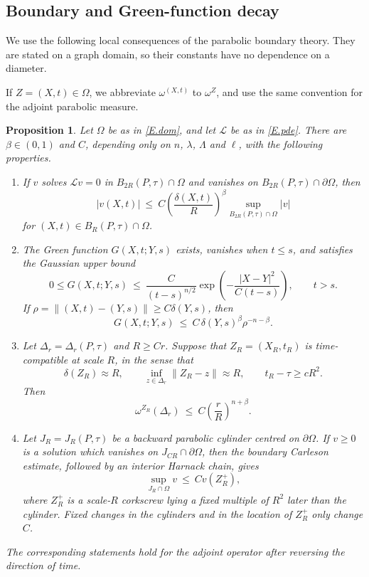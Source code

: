 \documentclass[10pt,a4paper]{amsart}
\numberwithin{equation}{section}
\newcommand{\om}{\Omega}
\newcommand{\pom}{\partial\Omega}
\newcommand{\LL}{\mathcal L}
\newtheorem{proposition}[equation]{Proposition}
\begin{document}
\subsection{Boundary and Green-function decay}\label{ss.potdecay}

We use the following local consequences of the parabolic boundary
theory. They are stated on a graph domain, so their constants have no
dependence on a diameter.

If $Z=(X,t)\in\om$, we abbreviate $\omega^{(X,t)}$ to $\omega^Z$, and use
the same convention for the adjoint parabolic measure.

\begin{proposition}\label{P.potdecay}
Let $\om$ be as in \eqref{E.dom}, and let $\LL$ be as in \eqref{E.pde}. There
are $\beta\in(0,1)$ and $C$, depending only on $n$, $\lambda$, $\Lambda$ and
$\ell$, with the following properties.
\begin{enumerate}
\item If $v$ solves $\LL v=0$ in $B_{2R}(P,\tau)\cap\om$ and vanishes on
  $B_{2R}(P,\tau)\cap\pom$, then
  \begin{equation}\label{E.bdryHolder}
   |v(X,t)|\ \le\ C\left(\frac{\delta(X,t)}R\right)^\beta
   \sup_{B_{2R}(P,\tau)\cap\om}|v|
  \end{equation}
  for $(X,t)\in B_R(P,\tau)\cap\om$.
\item The Green function $G(X,t;Y,s)$ exists, vanishes when $t\le s$, and
  satisfies the Gaussian upper bound
  \begin{equation}\label{E.GreenGaussian}
   0\le G(X,t;Y,s)\ \le\
   \frac{C}{(t-s)^{n/2}}
   \exp\left(-\frac{|X-Y|^2}{C(t-s)}\right),\qquad t>s.
  \end{equation}
  If $\rho=\|(X,t)-(Y,s)\|\ge C\delta(Y,s)$, then
  \begin{equation}\label{E.Greenbdry}
   G(X,t;Y,s)\ \le\ C\,\delta(Y,s)^\beta\rho^{-n-\beta}.
  \end{equation}
\item Let $\Delta_r=\Delta_r(P,\tau)$ and $R\ge Cr$.  Suppose that
  $Z_R=(X_R,t_R)$ is time-compatible at scale $R$, in the sense that
  \[
   \delta(Z_R)\approx R,\qquad
   \inf_{z\in\Delta_r}\|Z_R-z\|\approx R,\qquad t_R-\tau\ge cR^2.
  \]
  Then
  \begin{equation}\label{E.omegadecay}
   \omega^{Z_R}(\Delta_r)\ \le\ C\left(\frac rR\right)^{n+\beta}.
  \end{equation}
\item Let $J_R=J_R(P,\tau)$ be a backward parabolic cylinder centred on
  $\pom$. If $v\ge0$ is a solution which vanishes on $J_{CR}\cap\pom$, then
  the boundary Carleson estimate, followed by an interior
  Harnack chain, gives
  \begin{equation}\label{E.boundaryCarleson}
   \sup_{J_R\cap\om}v\ \le\ C v(Z_R^+),
  \end{equation}
  where $Z_R^+$ is a scale-$R$ corkscrew lying a fixed multiple of $R^2$
  later than the cylinder. Fixed changes in the cylinders and in the
  location of $Z_R^+$ only change $C$.
\end{enumerate}
The corresponding statements hold for the adjoint operator after reversing
the direction of time.
\end{proposition}
\end{document}
